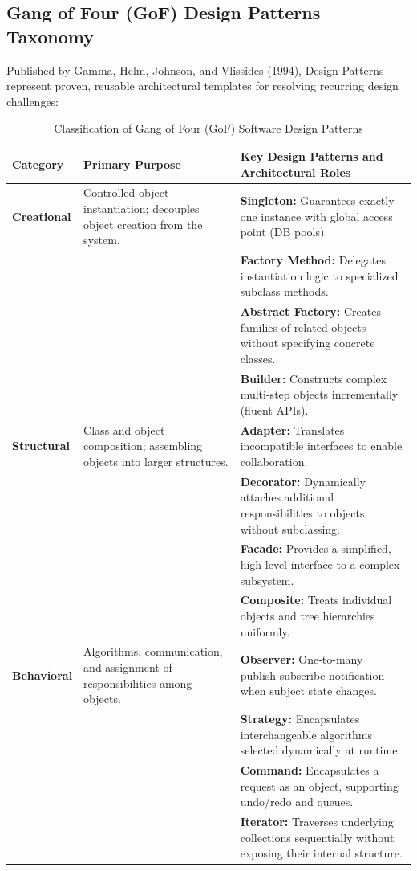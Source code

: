 \subsection{Gang of Four (GoF) Design Patterns Taxonomy}
Published by Gamma, Helm, Johnson, and Vlissides (1994), Design Patterns represent proven, reusable architectural templates for resolving recurring design challenges:
\begin{table}[htbp]
\centering
\small
\caption{Classification of Gang of Four (GoF) Software Design Patterns}
\label{tab:gof_design_patterns}
\begin{tabularx}{\textwidth}{l p{3.2cm} X}
\toprule
\textbf{Category} & \textbf{Primary Purpose} & \textbf{Key Design Patterns and Architectural Roles} \\
\midrule
\textbf{Creational} & Controlled object instantiation; decouples object creation from the system. & \textbf{Singleton:} Guarantees exactly one instance with global access point (DB pools). \\
& & \textbf{Factory Method:} Delegates instantiation logic to specialized subclass methods. \\
& & \textbf{Abstract Factory:} Creates families of related objects without specifying concrete classes. \\
& & \textbf{Builder:} Constructs complex multi-step objects incrementally (fluent APIs). \\
\midrule
\textbf{Structural} & Class and object composition; assembling objects into larger structures. & \textbf{Adapter:} Translates incompatible interfaces to enable collaboration. \\
& & \textbf{Decorator:} Dynamically attaches additional responsibilities to objects without subclassing. \\
& & \textbf{Facade:} Provides a simplified, high-level interface to a complex subsystem. \\
& & \textbf{Composite:} Treats individual objects and tree hierarchies uniformly. \\
\midrule
\textbf{Behavioral} & Algorithms, communication, and assignment of responsibilities among objects. & \textbf{Observer:} One-to-many publish-subscribe notification when subject state changes. \\
& & \textbf{Strategy:} Encapsulates interchangeable algorithms selected dynamically at runtime. \\
& & \textbf{Command:} Encapsulates a request as an object, supporting undo/redo and queues. \\
& & \textbf{Iterator:} Traverses underlying collections sequentially without exposing their internal structure. \\
\bottomrule
\end{tabularx}
\end{table}

